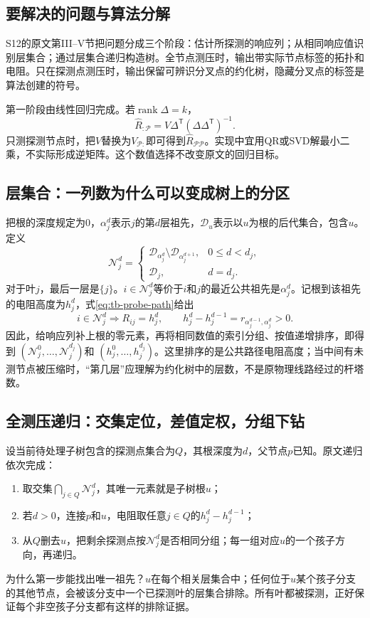\documentclass[UTF8,11pt,fontset=fandol,openany,oneside]{ctexbook}
\theoremstyle{definition}
\theoremstyle{remark}
\numberwithin{equation}{chapter}
\begin{document}
\subsection{要解决的问题与算法分解}

S12\citep{S12}的原文第III--V节把问题分成三个阶段：估计所探测的响应列；从相同响应值识别层集合；通过层集合递归构造树。全节点测压时，输出带实际节点标签的拓扑和电阻。只在探测点测压时，输出保留可辨识分叉点的约化树，隐藏分叉点的标签是算法创建的符号。

第一阶段由线性回归完成。若$\operatorname{rank}\Delta=k$，
\begin{equation}
 \widehat R_{:\mathcal P}
 =V\Delta^{\mathsf T}(\Delta\Delta^{\mathsf T})^{-1}.
 \label{eq:tb-S12-ls}
\end{equation}
只测探测节点时，把$V$替换为$V_{\mathcal P:}$即可得到$\widehat R_{\mathcal P\mathcal P}$。实现中宜用QR或SVD解最小二乘，不实际形成逆矩阵。这个数值选择不改变原文的回归目标。

\subsection{层集合：一列数为什么可以变成树上的分区}

把根的深度规定为0，$\alpha_j^d$表示$j$的第$d$层祖先，$\mathcal D_u$表示以$u$为根的后代集合，包含$u$。定义
\begin{equation}
 \mathcal N_j^d=
 \begin{cases}
 \mathcal D_{\alpha_j^d}\setminus\mathcal D_{\alpha_j^{d+1}},&0\leq d<d_j,\\
 \mathcal D_j,&d=d_j.
 \end{cases}
 \label{eq:tb-S12-level}
\end{equation}
对于叶$j$，最后一层是$\{j\}$。$i\in\mathcal N_j^d$等价于$i$和$j$的最近公共祖先是$\alpha_j^d$。记根到该祖先的电阻高度为$h_j^d$，式\eqref{eq:tb-probe-path}给出
\[
 i\in\mathcal N_j^d\Longrightarrow R_{ij}=h_j^d,\qquad
 h_j^d-h_j^{d-1}=r_{\alpha_j^{d-1},\alpha_j^d}>0.
\]
因此，给响应列补上根的零元素，再将相同数值的索引分组、按值递增排序，即得到
$(\mathcal N_j^0,\ldots,\mathcal N_j^{d_j})$和
$(h_j^0,\ldots,h_j^{d_j})$。这里排序的是公共路径电阻高度；当中间有未测节点被压缩时，“第几层”应理解为约化树中的层数，不是原物理线路经过的杆塔数。

\subsection{全测压递归：交集定位，差值定权，分组下钻}

设当前待处理子树包含的探测点集合为$Q$，其根深度为$d$，父节点$p$已知。原文递归依次完成：
\begin{enumerate}
 \item 取交集$\bigcap_{j\in Q}\mathcal N_j^d$，其唯一元素就是子树根$u$；
 \item 若$d>0$，连接$p$和$u$，电阻取任意$j\in Q$的$h_j^d-h_j^{d-1}$；
 \item 从$Q$删去$u$，把剩余探测点按$\mathcal N_j^d$是否相同分组；每一组对应$u$的一个孩子方向，再递归。
\end{enumerate}
为什么第一步能找出唯一祖先？$u$在每个相关层集合中；任何位于$u$某个孩子分支的其他节点，会被该分支中一个已探测叶的层集合排除。所有叶都被探测，正好保证每个非空孩子分支都有这样的排除证据。
\end{document}
